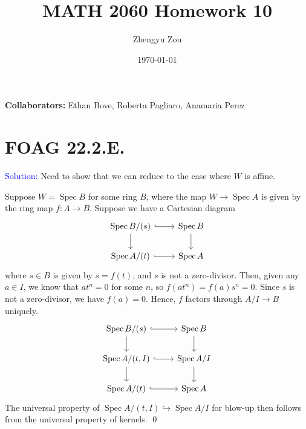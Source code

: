 \documentclass[11pt]{article}
\title{MATH 2060 Homework 10}
\author{Zhengyu Zou}
\date{\today}
\DeclareMathOperator{\Spec}{\operatorname{Spec}}
\newenvironment{solution}{\begin{trivlist}\item[]{\textcolor{blue}{Solution:}}}{\qed \end{trivlist}}
\begin{document}
\maketitle

\textbf{Collaborators:} Ethan Bove, Roberta Pagliaro, Anamaria Perez

\section*{FOAG 22.2.E.}

\begin{solution}
    Need to show that we can reduce to the case where $W$ is affine. 

    Suppose $W = \Spec B$ for some ring $B$, where the map $W \rightarrow \Spec A$ is given by the ring map $f: A \rightarrow B$. Suppose we have a Cartesian diagram 
    \[\begin{tikzcd}
        {\Spec B/(s)} & {\Spec B} \\
        {\Spec A/(t)} & {\Spec A}
        \arrow[hook, from=1-1, to=1-2]
        \arrow[from=1-1, to=2-1]
        \arrow[from=1-2, to=2-2]
        \arrow[hook, from=2-1, to=2-2]
    \end{tikzcd}\]
    where $s \in B$ is given by $s = f(t)$, and $s$ is not a zero-divisor. Then, given any $a \in I$, we know that $at^n = 0$ for some $n$, so $f(at^n) = f(a) s^n = 0$. Since $s$ is not a zero-divisor, we have $f(a) = 0$. Hence, $f$ factors through $A/I \rightarrow B$ uniquely. 
    \[\begin{tikzcd}
        {\Spec B/(s)} & {\Spec B} \\
        {\Spec A/(t,I)} & {\Spec A / I} \\
        {\Spec A/(t)} & {\Spec A}
        \arrow[hook, from=1-1, to=1-2]
        \arrow[from=1-1, to=2-1]
        \arrow[from=1-2, to=2-2]
        \arrow[hook, from=2-1, to=2-2]
        \arrow[from=2-1, to=3-1]
        \arrow[from=2-2, to=3-2]
        \arrow[hook, from=3-1, to=3-2]
    \end{tikzcd}\]
    The universal property of $\Spec A / (t, I) \hookrightarrow \Spec A / I$ for blow-up then follows from the universal property of kernels. 
\end{solution}
\end{document}
